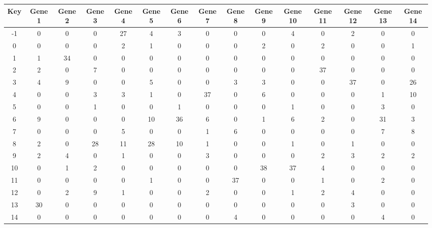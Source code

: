 \begin{tabular}{|c|c|c|c|c|c|c|c|c|c|c|c|c|c|c|}
\hline
Key & Gene 1 & Gene 2 & Gene 3 & Gene 4 & Gene 5 & Gene 6 & Gene 7 & Gene 8 & Gene 9 & Gene 10 & Gene 11 & Gene 12 & Gene 13 & Gene 14 \\
\hline
-1 & 0 & 0 & 0 & 27 & 4 & 3 & 0 & 0 & 0 & 4 & 0 & 2 & 0 & 0 \\
0 & 0 & 0 & 0 & 2 & 1 & 0 & 0 & 0 & 2 & 0 & 2 & 0 & 0 & 1 \\
1 & 1 & 34 & 0 & 0 & 0 & 0 & 0 & 0 & 0 & 0 & 0 & 0 & 0 & 0 \\
2 & 2 & 0 & 7 & 0 & 0 & 0 & 0 & 0 & 0 & 0 & 37 & 0 & 0 & 0 \\
3 & 4 & 9 & 0 & 0 & 5 & 0 & 0 & 3 & 3 & 0 & 0 & 37 & 0 & 26 \\
4 & 0 & 0 & 3 & 3 & 1 & 0 & 37 & 0 & 6 & 0 & 0 & 0 & 1 & 10 \\
5 & 0 & 0 & 1 & 0 & 0 & 1 & 0 & 0 & 0 & 1 & 0 & 0 & 3 & 0 \\
6 & 9 & 0 & 0 & 0 & 10 & 36 & 6 & 0 & 1 & 6 & 2 & 0 & 31 & 3 \\
7 & 0 & 0 & 0 & 5 & 0 & 0 & 1 & 6 & 0 & 0 & 0 & 0 & 7 & 8 \\
8 & 2 & 0 & 28 & 11 & 28 & 10 & 1 & 0 & 0 & 1 & 0 & 1 & 0 & 0 \\
9 & 2 & 4 & 0 & 1 & 0 & 0 & 3 & 0 & 0 & 0 & 2 & 3 & 2 & 2 \\
10 & 0 & 1 & 2 & 0 & 0 & 0 & 0 & 0 & 38 & 37 & 4 & 0 & 0 & 0 \\
11 & 0 & 0 & 0 & 0 & 1 & 0 & 0 & 37 & 0 & 0 & 1 & 0 & 2 & 0 \\
12 & 0 & 2 & 9 & 1 & 0 & 0 & 2 & 0 & 0 & 1 & 2 & 4 & 0 & 0 \\
13 & 30 & 0 & 0 & 0 & 0 & 0 & 0 & 0 & 0 & 0 & 0 & 3 & 0 & 0 \\
14 & 0 & 0 & 0 & 0 & 0 & 0 & 0 & 4 & 0 & 0 & 0 & 0 & 4 & 0 \\
\hline
\end{tabular}